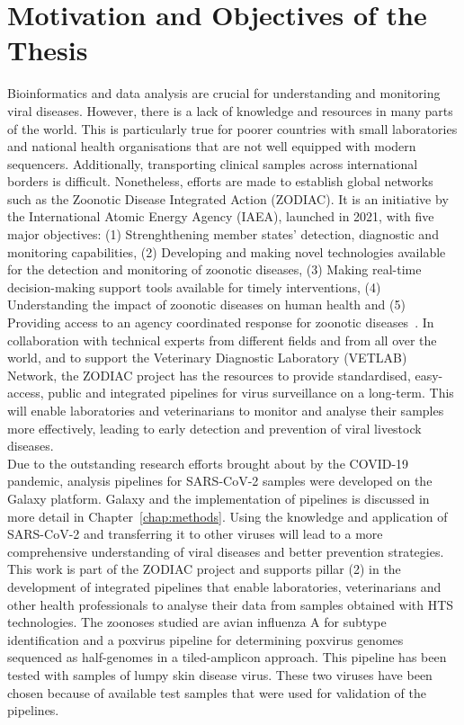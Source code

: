 \section{Motivation and Objectives of the Thesis}
Bioinformatics and data analysis are crucial for understanding and monitoring viral diseases. However, there is a lack of knowledge and resources in many parts of the world. This is particularly true for poorer countries with small laboratories and national health organisations that are not well equipped with modern sequencers. Additionally, transporting clinical samples across international borders is difficult. Nonetheless, efforts are made to establish global networks such as the Zoonotic Disease Integrated Action (ZODIAC). It is an initiative by the International Atomic Energy Agency (IAEA), launched in 2021, with five major objectives: (1) Strenghthening member states' detection, diagnostic and monitoring capabilities, (2) Developing and making novel technologies available for the detection and monitoring of zoonotic diseases, (3) Making real-time decision-making support tools available for timely interventions, (4) Understanding the impact of zoonotic diseases on human health and (5) Providing access to an agency coordinated response for zoonotic diseases~\cite{zodiac2021}. In collaboration with technical experts from different fields and from all over the world, and to support the Veterinary Diagnostic Laboratory (VETLAB) Network, the ZODIAC project has the resources to provide standardised, easy-access, public and integrated pipelines for virus surveillance on a long-term. This will enable laboratories and veterinarians to monitor and analyse their samples more effectively, leading to early detection and prevention of viral livestock diseases.\\
Due to the outstanding research efforts brought about by the COVID-19 pandemic, analysis pipelines for SARS-CoV-2 samples were developed on the Galaxy platform. Galaxy and the implementation of pipelines is discussed in more detail in Chapter~\ref{chap:methods}. Using the knowledge and application of SARS-CoV-2 and transferring it to other viruses will lead to a more comprehensive understanding of viral diseases and better prevention strategies.\\
This work is part of the ZODIAC project and supports pillar (2) in the development of integrated pipelines that enable laboratories, veterinarians and other health professionals to analyse their data from samples obtained with HTS technologies. The zoonoses studied are avian influenza A for subtype identification and a poxvirus pipeline for determining poxvirus genomes sequenced as half-genomes in a tiled-amplicon approach. This pipeline has been tested with samples of lumpy skin disease virus. These two viruses have been chosen because of available test samples that were used for validation of the pipelines. \\
